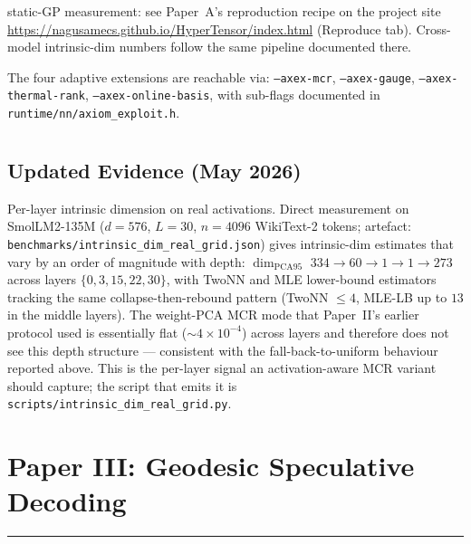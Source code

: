 \documentclass[11pt]{article}
\begin{document}
\label{sec:repro}
static-GP measurement: see Paper~A's reproduction recipe on the project site
\url{https://nagusamecs.github.io/HyperTensor/index.html} (Reproduce tab).
Cross-model intrinsic-dim numbers follow the same pipeline documented there.

The four adaptive extensions are reachable via:
\texttt{--axex-mcr}, \texttt{--axex-gauge}, \texttt{--axex-thermal-rank},
\texttt{--axex-online-basis}, with sub-flags documented in
\texttt{runtime/nn/axiom\_exploit.h}.

\section*{}

\clearpage
\printbibliography

\subsection{Updated Evidence (May 2026)}
Per-layer intrinsic dimension on real activations.
Direct measurement on SmolLM2-135M ($d{=}576$, $L{=}30$, $n{=}4096$
WikiText-2 tokens; artefact:
\texttt{benchmarks/intrinsic\_dim\_real\_grid.json}) gives intrinsic-dim
estimates that vary by an order of magnitude with depth: $\dim_{\text{PCA95}}$
$334\to 60\to 1\to 1\to 273$ across layers $\{0,3,15,22,30\}$, with TwoNN
and MLE lower-bound estimators tracking the same collapse-then-rebound
pattern (TwoNN $\le 4$, MLE-LB up to $13$ in the middle layers).  The
weight-PCA MCR mode that Paper~II's earlier protocol used is essentially
flat ($\sim 4\times 10^{-4}$) across layers and therefore does not see
this depth structure --- consistent with the fall-back-to-uniform
behaviour reported above.  This is the per-layer signal an
activation-aware MCR variant should capture; the script that emits it is
\texttt{scripts/intrinsic\_dim\_real\_grid.py}.

\newpage



\newpage
\section{Paper III: Geodesic Speculative Decoding}
\vspace{6pt}
\hrule
\vspace{12pt}
\end{document}
